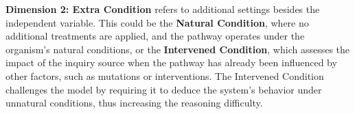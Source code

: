 % 







\textbf{Dimension 2: Extra Condition} refers to additional settings besides the independent variable. This could be the \textbf{Natural Condition}, where no additional treatments are applied, and the pathway operates under the organism's natural conditions, or the \textbf{Intervened Condition}, which assesses the impact of the inquiry source when the pathway has already been influenced by other factors, such as mutations or interventions. The Intervened Condition challenges the model by requiring it to deduce the system's behavior under unnatural conditions, thus increasing the reasoning difficulty.










